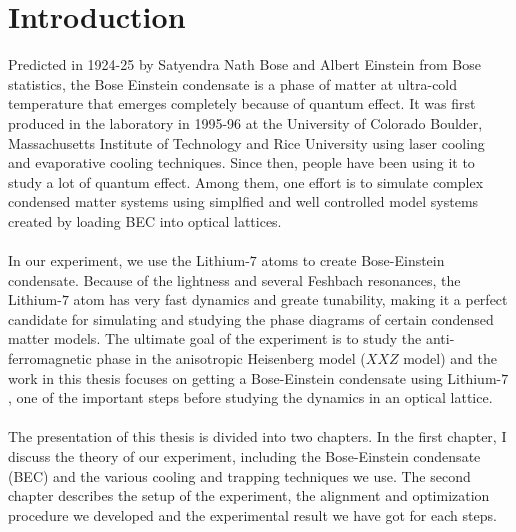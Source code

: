 \chapter*{Introduction}

Predicted in 1924-25 by Satyendra Nath Bose and Albert Einstein from Bose statistics, the Bose Einstein condensate is a phase of matter at ultra-cold temperature that emerges completely because of quantum effect. It was first produced in the laboratory in 1995-96 at the University of Colorado Boulder, Massachusetts Institute of Technology and Rice University using laser cooling and evaporative cooling techniques. Since then, people have been using it to study a lot of quantum effect. Among them, one effort is to simulate complex condensed matter systems using simplfied and well controlled model systems created by loading BEC into optical lattices.\\
\\
In our experiment, we use the Lithium-$7$ atoms to create Bose-Einstein condensate. Because of the lightness and several Feshbach resonances, the Lithium-$7$ atom has very fast dynamics and greate tunability, making it a perfect candidate for simulating and studying the phase diagrams of certain condensed matter models. The ultimate goal of the experiment is to study the anti-ferromagnetic phase in the anisotropic Heisenberg model ($XXZ$ model) and the work in this thesis focuses on getting a Bose-Einstein condensate using Lithium-$7$, one of the important steps before studying the dynamics in an optical lattice.\\
\\
The presentation of this thesis is divided into two chapters. In the first chapter, I discuss the theory of our experiment, including the Bose-Einstein condensate (BEC) and the various cooling and trapping techniques we use. The second chapter describes the setup of the experiment, the alignment and optimization procedure we developed and the experimental result we have got for each steps.
